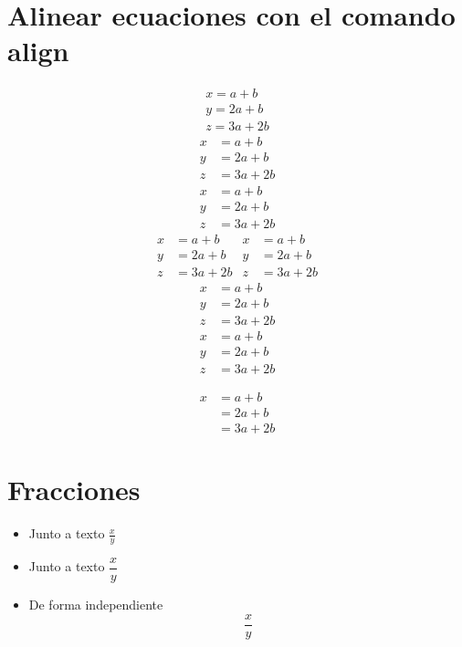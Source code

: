 \documentclass[12pt]{article}
\begin{document}
\section{Alinear ecuaciones con el comando align}
\begin{align}
x=a+b \\
y=2a+b \\
z=3a+2b 
\end{align}
\begin{align}
x &= a + b \\
y &= 2a + b \\
z &= 3a + 2b 
\end{align}
\begin{align*}
x &= a + b \\
y &= 2a + b \\
z &= 3a + 2b 
\end{align*}
\begin{align}
x &= a + b   & x &= a + b\\
y &= 2a + b  & y &= 2a + b\\
z &= 3a + 2b & z &= 3a + 2b
\end{align}
\begin{align}
x &= a + b \nonumber \\
y &= 2a + b \\
z &= 3a + 2b 
\end{align}
\begin{align}
x &= a + b \nonumber \\
y &= 2a + b \\
z &= 3a + 2b \nonumber
\end{align}

\begin{align}
x &= a + b \nonumber \\
  &= 2a + b \\
  &= 3a + 2b \nonumber
\end{align}

\section{Fracciones}
\begin{itemize}
\item Junto a texto $ \frac{x}{y} $
\item Junto a texto $ \dfrac{x}{y} $
\item De forma independiente \[ \frac{x}{y} \]
\end{itemize}
\end{document}

